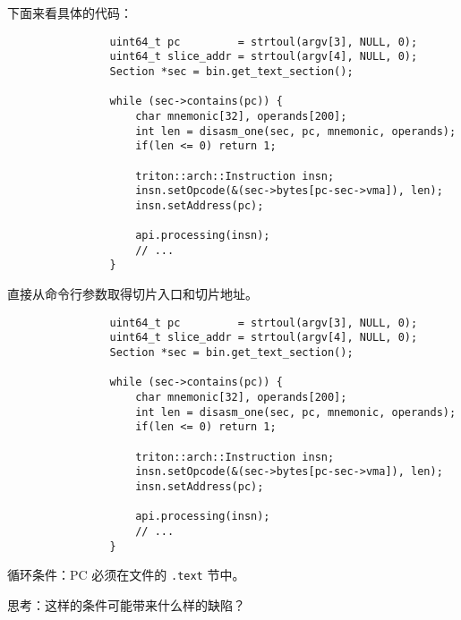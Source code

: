\documentclass{ctexbeamer}
\begin{document}
    \begin{frame}[fragile]
    
        下面来看具体的代码：

        {
            \small
            \begin{verbatim}
                uint64_t pc         = strtoul(argv[3], NULL, 0);
                uint64_t slice_addr = strtoul(argv[4], NULL, 0);
                Section *sec = bin.get_text_section();
                
                while (sec->contains(pc)) {
                    char mnemonic[32], operands[200];
                    int len = disasm_one(sec, pc, mnemonic, operands);
                    if(len <= 0) return 1;

                    triton::arch::Instruction insn;
                    insn.setOpcode(&(sec->bytes[pc-sec->vma]), len);
                    insn.setAddress(pc);

                    api.processing(insn);
                    // ...
                }
            \end{verbatim}
        }

        直接从命令行参数取得切片入口和切片地址。
    
    \end{frame}

    \begin{frame}[fragile]

        {
            \small
            \begin{verbatim}
                uint64_t pc         = strtoul(argv[3], NULL, 0);
                uint64_t slice_addr = strtoul(argv[4], NULL, 0);
                Section *sec = bin.get_text_section();
                
                while (sec->contains(pc)) {
                    char mnemonic[32], operands[200];
                    int len = disasm_one(sec, pc, mnemonic, operands);
                    if(len <= 0) return 1;

                    triton::arch::Instruction insn;
                    insn.setOpcode(&(sec->bytes[pc-sec->vma]), len);
                    insn.setAddress(pc);

                    api.processing(insn);
                    // ...
                }
            \end{verbatim}
        }

        循环条件：PC 必须在文件的 \texttt{.text} 节中。\pause

        思考：这样的条件可能带来什么样的缺陷？
    
    \end{frame}
\end{document}

